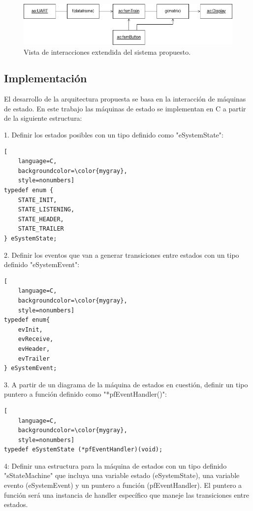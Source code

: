 \begin{figure}[ht]
	\centering
	\includegraphics[width=1\textwidth]{./Figures/diagVistaDisenhoExtendida.png}
	\caption{Vista de interacciones extendida del sistema propuesto.}
	\label{fig:diagVistaDisenhoExtendida}
\end{figure}

\pagebreak
\subsection{Implementación}

El desarrollo de la arquitectura propuesta se basa en la interacción de máquinas de estado.
En este trabajo las máquinas de estado se implementan en C a partir de la siguiente estructura:

1. Definir los estados posibles con un tipo definido como "eSystemState":

\begin{lstlisting}[
	language=C, 
	backgroundcolor=\color{mygray},
	style=nonumbers]
typedef enum {
	STATE_INIT,
	STATE_LISTENING,
	STATE_HEADER,
	STATE_TRAILER
} eSystemState;
\end{lstlisting}

2. Definir los eventos que van a generar transiciones entre estados con un tipo definido "eSystemEvent":

\begin{lstlisting}[
	language=C, 
	backgroundcolor=\color{mygray},
	style=nonumbers]
typedef enum{
	evInit,
	evReceive,
	evHeader,
	evTrailer
} eSystemEvent;
\end{lstlisting}

3. A partir de un diagrama de la máquina de estados en cuestión, 
definir un tipo puntero a función definido como "*pfEventHandler()":

\begin{lstlisting}[
	language=C, 
	backgroundcolor=\color{mygray},
	style=nonumbers]
typedef eSystemState (*pfEventHandler)(void);
\end{lstlisting}

4: Definir una estructura para la máquina de estados con un tipo definido "sStateMachine" que incluya una variable estado (eSystemState), una variable evento (eSystemEvent) y un puntero a función (pfEventHandler). El puntero a función será una instancia de handler específico que maneje las transiciones entre estados. 

